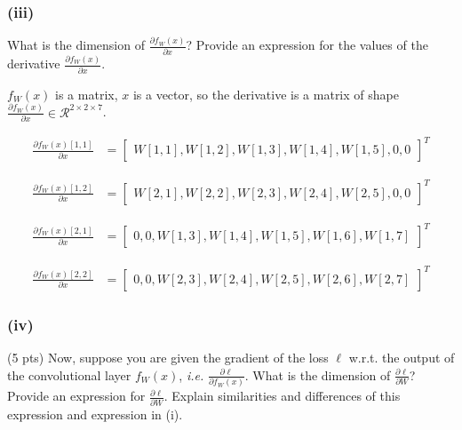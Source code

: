 \begin{enumerate}[(a)]
\subsubsection*{(iii)}
What is the dimension of $\frac {\partial f_W(x)}{\partial x}$? Provide an expression for the values of the derivative $\frac {\partial f_W(x)}{\partial x}$. 




$f_{W}(x)$ is a matrix, $x$ is a vector, so the derivative is a matrix of shape $\frac{\partial f_{W}(x)}{\partial x} \in \mathcal{R} ^ {2 \times 2 \times 7}$.


\begin{align}
    \frac{\partial f_{W}(x)[1, 1]}{\partial x} 
    &=\begin{bmatrix}
        W[1,1],  W[1,2], W[1,3], W[1,4], W[1,5], 0,0
    \end{bmatrix}^T
\end{align}

\begin{align}
    \frac{\partial f_{W}(x)[1, 2]}{\partial x} 
    &=\begin{bmatrix}
        W[2,1], W[2,2], W[2,3], W[2,4], W[2,5], 0, 0
    \end{bmatrix}^T
\end{align}

\begin{align}
    \frac{\partial f_{W}(x)[2, 1]}{\partial x} 
    &=\begin{bmatrix}
        0,0, W[1,3], W[1,4], W[1,5], W[1,6], W[1,7]
    \end{bmatrix}^T
\end{align}


\begin{align}
    \frac{\partial f_{W}(x)[2, 2]}{\partial x} 
    &=\begin{bmatrix}
        0,0, W[2,3], W[2,4], W[2,5], W[2,6], W[2,7]
    \end{bmatrix}^T
\end{align}

\subsubsection*{(iv)}

(5 pts) Now, suppose you are given the gradient of the loss $\ell$ w.r.t. the output of the convolutional layer $f_W(x)$, \emph{i.e.} 
    $\frac {\partial \ell}{\partial f_W(x)}$. What is the dimension of $\frac {\partial \ell}{\partial W}$? Provide an expression for $ \frac {\partial \ell}{\partial W}$. Explain similarities and differences of this expression and expression in (i).



\end{enumerate}
